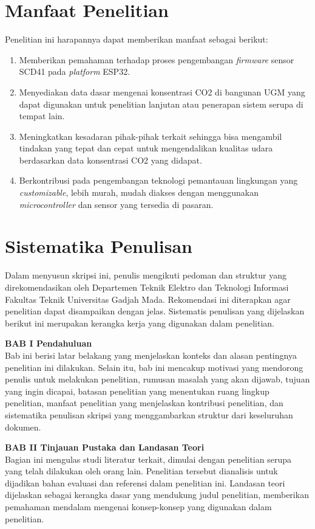 \newpage

\section{Manfaat Penelitian}
Penelitian ini harapannya dapat memberikan manfaat sebagai berikut: 

\begin{enumerate}
    \item Memberikan pemahaman terhadap proses pengembangan \textit{firmware} sensor SCD41 pada \textit{platform} ESP32.
    \item Menyediakan data dasar mengenai konsentrasi CO2 di bangunan UGM yang dapat digunakan untuk penelitian lanjutan atau penerapan sistem serupa di tempat lain. 
    \item Meningkatkan kesadaran pihak-pihak terkait sehingga bisa mengambil tindakan yang tepat dan cepat untuk mengendalikan kualitas udara berdasarkan data konsentrasi CO2 yang didapat.
    \item Berkontribusi pada pengembangan teknologi pemantauan lingkungan yang \textit{customizable}, lebih murah, mudah diakses dengan menggunakan \textit{microcontroller} dan sensor yang tersedia di pasaran. 
\end{enumerate}

\section{Sistematika Penulisan}

Dalam menyusun skripsi ini, penulis mengikuti pedoman dan struktur yang direkomendasikan oleh Departemen Teknik Elektro dan Teknologi Informasi Fakultas Teknik Universitas Gadjah Mada. Rekomendasi ini diterapkan agar penelitian dapat disampaikan dengan jelas. Sistematis penulisan yang dijelaskan berikut ini merupakan kerangka kerja yang digunakan dalam penelitian.

\noindent \textbf{BAB I Pendahuluan} \\
Bab ini berisi latar belakang yang menjelaskan konteks dan alasan pentingnya penelitian ini dilakukan. Selain itu, bab ini mencakup motivasi yang mendorong penulis untuk melakukan penelitian, rumusan masalah yang akan dijawab, tujuan yang ingin dicapai, batasan penelitian yang menentukan ruang lingkup penelitian, manfaat penelitian yang menjelaskan kontribusi penelitian, dan sistematika penulisan skripsi yang menggambarkan struktur dari keseluruhan dokumen.

\noindent \textbf{BAB II Tinjauan Pustaka dan Landasan Teori} \\
Bagian ini mengulas studi literatur terkait, dimulai dengan penelitian serupa yang telah dilakukan oleh orang lain. Penelitian tersebut dianalisis untuk dijadikan bahan evaluasi dan referensi dalam penelitian ini. Landasan teori dijelaskan sebagai kerangka dasar yang mendukung judul penelitian, memberikan pemahaman mendalam mengenai konsep-konsep yang digunakan dalam penelitian.

